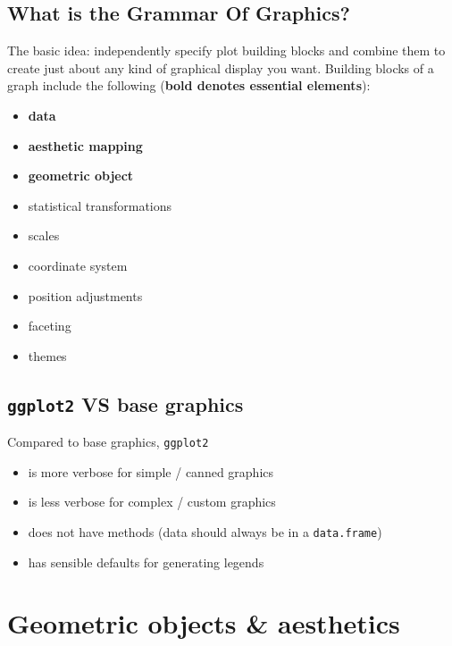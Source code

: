 \documentclass[]{book}
\providecommand{\tightlist}{%
  \setlength{\itemsep}{0pt}\setlength{\parskip}{0pt}}
\begin{document}
\hypertarget{what-is-the-grammar-of-graphics}{%
\subsection{What is the Grammar Of Graphics?}\label{what-is-the-grammar-of-graphics}}

The basic idea: independently specify plot building blocks and combine them to create just
about any kind of graphical display you want. Building blocks of a graph include the
following (\textbf{bold denotes essential elements}):

\begin{itemize}
\tightlist
\item
  \textbf{data}
\item
  \textbf{aesthetic mapping}
\item
  \textbf{geometric object}
\item
  statistical transformations
\item
  scales
\item
  coordinate system
\item
  position adjustments
\item
  faceting
\item
  themes
\end{itemize}

\hypertarget{ggplot2-vs-base-graphics}{%
\subsection{\texorpdfstring{\texttt{ggplot2} VS base graphics}{ggplot2 VS base graphics}}\label{ggplot2-vs-base-graphics}}

Compared to base graphics, \texttt{ggplot2}

\begin{itemize}
\tightlist
\item
  is more verbose for simple / canned graphics
\item
  is less verbose for complex / custom graphics
\item
  does not have methods (data should always be in a \texttt{data.frame})
\item
  has sensible defaults for generating legends
\end{itemize}

\hypertarget{geometric-objects-aesthetics}{%
\section{Geometric objects \& aesthetics}\label{geometric-objects-aesthetics}}
\end{document}
